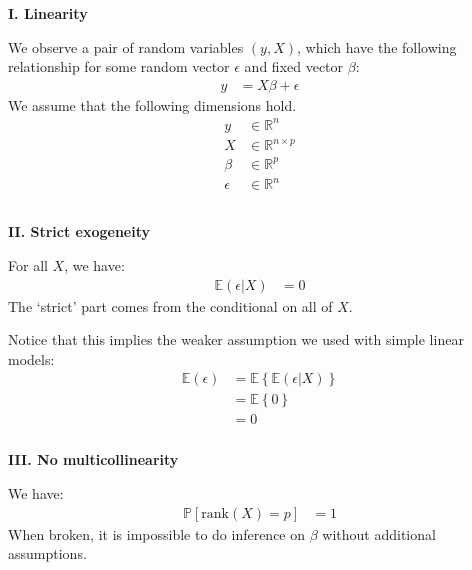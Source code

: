 \begin{frame}[fragile] \frametitle{}

{\bf I. Linearity}

We observe a pair of random variables $(y, X)$, which
have the following relationship for some random vector
$\epsilon$ and fixed vector $\beta$:
\begin{align*}
y &= X \beta + \epsilon
\end{align*}
\pause We assume that the following dimensions hold.
\begin{align*}
y &\in \mathbb{R}^n \\
X &\in \mathbb{R}^{n \times p} \\
\beta &\in \mathbb{R}^p \\
\epsilon &\in \mathbb{R}^n \\
\end{align*}

\end{frame}

\begin{frame}[fragile] \frametitle{}

{\bf II. Strict exogeneity}

For all $X$, we have:
\begin{align}
\mathbb{E} \left( \epsilon | X \right) &= 0
\end{align}
\pause The `strict' part comes from the conditional on all
of $X$.

\pause Notice that this implies the weaker assumption we
used with simple linear models:
\begin{align}
\mathbb{E} \left( \epsilon \right) &= \mathbb{E} \left\{ \mathbb{E} \left( \epsilon | X \right) \right\} \\
&= \mathbb{E} \left\{  0 \right\} \\
&= 0
\end{align}

\end{frame}


\begin{frame}[fragile] \frametitle{}

{\bf III. No multicollinearity}

We have:
\begin{align*}
\mathbb{P} \left[ \text{rank} (X) = p \right] &= 1
\end{align*}
\pause When broken, it is impossible to do inference
on $\beta$ without additional assumptions.

\end{frame}

